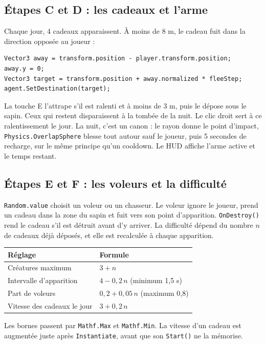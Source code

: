 \documentclass[11pt,a4paper]{article}
\begin{document}
\subsection{Étapes C et D : les cadeaux et l'arme}
Chaque jour, 4 cadeaux apparaissent. À moins de 8 m, le cadeau fuit dans la direction opposée au joueur :
\begin{lstlisting}
Vector3 away = transform.position - player.transform.position;
away.y = 0;
Vector3 target = transform.position + away.normalized * fleeStep;
agent.SetDestination(target);
\end{lstlisting}
La touche E l'attrape s'il est ralenti et à moins de 3 m, puis le dépose sous le sapin. Ceux qui restent disparaissent à la tombée de la nuit. Le clic droit sert à ce ralentissement le jour. La nuit, c'est un canon : le rayon donne le point d'impact, \texttt{Physics.OverlapSphere} blesse tout autour sauf le joueur, puis 5 secondes de recharge, sur le même principe qu'un cooldown. Le HUD affiche l'arme active et le temps restant.

\subsection{Étapes E et F : les voleurs et la difficulté}
\texttt{Random.value} choisit un voleur ou un chasseur. Le voleur ignore le joueur, prend un cadeau dans la zone du sapin et fuit vers son point d'apparition. \texttt{OnDestroy()} rend le cadeau s'il est détruit avant d'y arriver. La difficulté dépend du nombre $n$ de cadeaux déjà déposés, et elle est recalculée à chaque apparition.

\begin{table}[H]
\centering
\begin{tabular}{ll}
\toprule
\textbf{Réglage} & \textbf{Formule} \\
\midrule
Créatures maximum & $3 + n$ \\
Intervalle d'apparition & $4 - 0{,}2\,n$ (minimum 1,5 s) \\
Part de voleurs & $0{,}2 + 0{,}05\,n$ (maximum 0,8) \\
Vitesse des cadeaux le jour & $3 + 0{,}2\,n$ \\
\bottomrule
\end{tabular}
\end{table}

Les bornes passent par \texttt{Mathf.Max} et \texttt{Mathf.Min}. La vitesse d'un cadeau est augmentée juste après \texttt{Instantiate}, avant que son \texttt{Start()} ne la mémorise.
\end{document}
